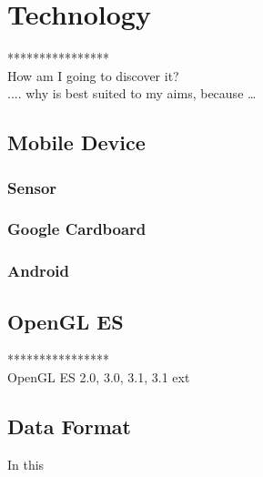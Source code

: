 \label{chapter-technology}
\chapter{Technology}

****************\\
How am I going to discover it?\\
.... why is best suited to my aims, because …\\

\section{Mobile Device}

\subsection{Sensor}

\subsection{Google Cardboard}

\subsection{Android}

\section{OpenGL ES}

****************\\
OpenGL ES 2.0, 3.0,  3.1, 3.1 ext\\

\section{Data Format}

In this

